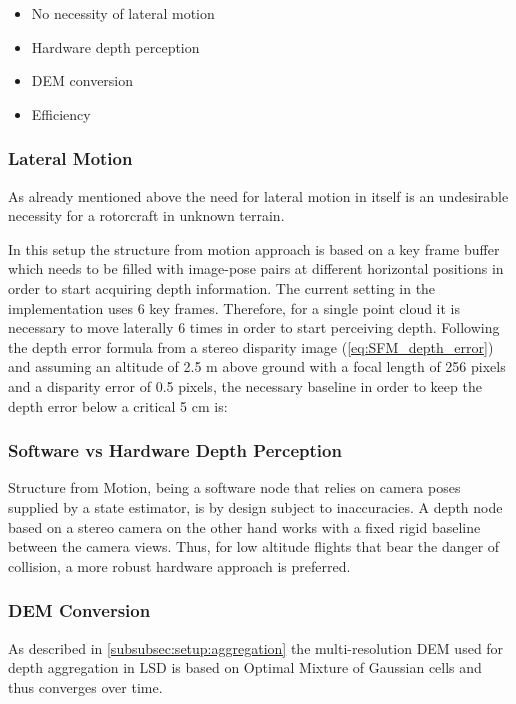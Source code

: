 \begin{itemize}
    \item No necessity of lateral motion
    \item Hardware depth perception
    \item DEM conversion
    \item Efficiency
\end{itemize}

\subsubsection{Lateral Motion}

As already mentioned above the need for lateral motion in itself is an undesirable necessity for a rotorcraft in unknown terrain. 

In this setup the structure from motion approach is based on a key frame buffer which needs to be filled with image-pose pairs at different horizontal positions in order to start acquiring depth information. The current setting in the implementation \citet{SFM} uses 6 key frames. Therefore, for a single point cloud it is necessary to move laterally 6 times in order to start perceiving depth. Following the depth error formula from a stereo disparity image (\ref{eq:SFM_depth_error}) and assuming an altitude of 2.5 m above ground with a focal length of 256 pixels and a disparity error of 0.5 pixels, the necessary baseline in order to keep the depth error below a critical 5 cm is:

\subsubsection{Software vs Hardware Depth Perception}

Structure from Motion, being a software node that relies on camera poses supplied by a state estimator, is by design subject to inaccuracies. A depth node based on a stereo camera on the other hand works with a fixed rigid baseline between the camera views. Thus, for low altitude flights that bear the danger of collision, a more robust hardware approach is preferred.

\subsubsection{DEM Conversion}

As described in \cref{subsubsec:setup:aggregation} the multi-resolution DEM used for depth aggregation in LSD is based on Optimal Mixture of Gaussian cells and thus converges over time. 

